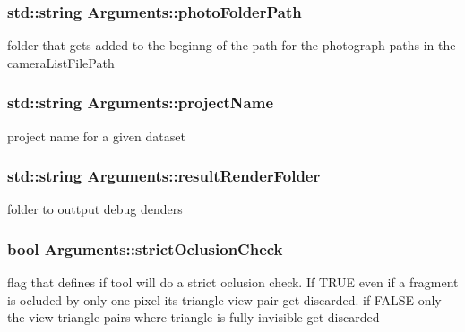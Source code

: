 \subsubsection[{photo\+Folder\+Path}]{\setlength{\rightskip}{0pt plus 5cm}std\+::string Arguments\+::photo\+Folder\+Path}\label{struct_arguments_a784aabe9dd9bbeb828d1ad845b72887c}
folder that gets added to the beginng of the path for the photograph paths in the camera\+List\+File\+Path \hypertarget{struct_arguments_a5ce8b0bed244a327b762f2bb1630708b}{}
\subsubsection[{project\+Name}]{\setlength{\rightskip}{0pt plus 5cm}std\+::string Arguments\+::project\+Name}\label{struct_arguments_a5ce8b0bed244a327b762f2bb1630708b}
project name for a given dataset \hypertarget{struct_arguments_adadef95480756dd3922728cd40b8d334}{}
\subsubsection[{result\+Render\+Folder}]{\setlength{\rightskip}{0pt plus 5cm}std\+::string Arguments\+::result\+Render\+Folder}\label{struct_arguments_adadef95480756dd3922728cd40b8d334}
folder to outtput debug denders \hypertarget{struct_arguments_ab0a6f926571b9ebd895f84af4214880b}{}
\subsubsection[{strict\+Oclusion\+Check}]{\setlength{\rightskip}{0pt plus 5cm}bool Arguments\+::strict\+Oclusion\+Check}\label{struct_arguments_ab0a6f926571b9ebd895f84af4214880b}
flag that defines if tool will do a strict oclusion check. If T\+R\+U\+E even if a fragment is ocluded by only one pixel its triangle-\/view pair get discarded. if F\+A\+L\+S\+E only the view-\/triangle pairs where triangle is fully invisible get discarded \hypertarget{struct_arguments_acba64f044d4603abac85ba2cf1b50b75}{}
